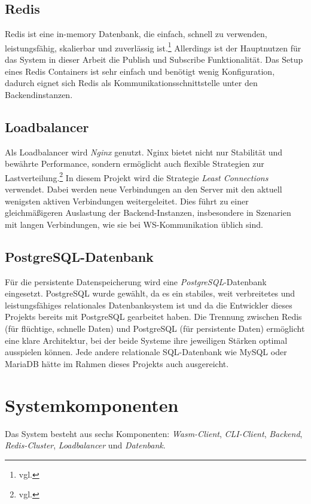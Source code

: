 \subsection{Redis}
Redis ist eine in-memory Datenbank, die einfach, schnell zu verwenden, leistungsfähig, skalierbar und zuverlässig ist.\footnote{vgl. }
Allerdings ist der Hauptnutzen für das System in dieser Arbeit die Publish und Subscribe Funktionalität.
Das Setup eines Redis Containers ist sehr einfach und benötigt wenig Konfiguration, dadurch eignet sich Redis als Kommunikationsschnittstelle unter den Backendinstanzen.

\subsection{Loadbalancer}
Als Loadbalancer wird \textit{Nginx} genutzt. 
Nginx bietet nicht nur Stabilität und bewährte Performance, sondern ermöglicht auch flexible Strategien 
zur Lastverteilung.\footnote{vgl. }  
In diesem Projekt wird die Strategie \textit{Least Connections} verwendet. Dabei werden neue Verbindungen 
an den Server mit den aktuell wenigsten aktiven Verbindungen weitergeleitet.  
Dies führt zu einer gleichmäßigeren Auslastung der Backend-Instanzen, insbesondere in Szenarien mit 
langen Verbindungen, wie sie bei \ac{WS}-Kommunikation üblich sind.

\subsection{PostgreSQL-Datenbank}
Für die persistente Datenspeicherung wird eine \textit{PostgreSQL}-Datenbank eingesetzt.  
PostgreSQL wurde gewählt, da es ein stabiles, weit verbreitetes und leistungsfähiges relationales Datenbanksystem ist und da die Entwickler dieses Projekts bereits mit PostgreSQL gearbeitet haben.
Die Trennung zwischen Redis (für flüchtige, schnelle Daten) und PostgreSQL (für persistente Daten) 
ermöglicht eine klare Architektur, bei der beide Systeme ihre jeweiligen Stärken optimal ausspielen können.
Jede andere relationale SQL-Datenbank wie MySQL oder MariaDB hätte im Rahmen dieses Projekts auch ausgereicht.

\section{Systemkomponenten}
Das System besteht aus sechs Komponenten: \textit{\ac{Wasm}-Client}, \textit{\ac{CLI}-Client}, \textit{Backend}, \textit{Redis-Cluster}, \textit{Loadbalancer} und \textit{Datenbank}.

